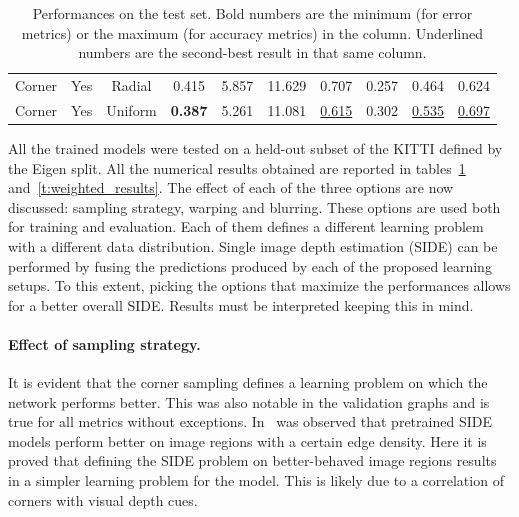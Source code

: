 \begin{table}
{\begin{tabular}{c|c|c|c|c|c|c|c|c|c}
        Corner & Yes & Radial  &            0.415  &            5.857  &            11.629  &            0.707  &            0.257  &            0.464  &            0.624  \\
        Corner & Yes & Uniform &    \textbf{0.387} &            5.261  &            11.081  & \underline{0.615} &            0.302  & \underline{0.535} & \underline{0.697} \\
    \end{tabular}
    }
    \caption{
        Performances on the test set.
        Bold numbers are the minimum (for error metrics) or the maximum (for accuracy metrics) in the column.
        Underlined numbers are the second-best result in that same column.
        \label{t:results}
    }
\end{table}

All the trained models were tested on a held-out subset of the KITTI defined by the Eigen split.
All the numerical results obtained are reported in tables~\ref{t:results} and~\ref{t:weighted_results}.
The effect of each of the three options are now discussed: sampling strategy, warping and blurring.
These options are used both for training and evaluation.
Each of them defines a different learning problem with a different data distribution.
Single image depth estimation (SIDE) can be performed by fusing the predictions produced by each of the proposed learning setups.
To this extent, picking the options that maximize the performances allows for a better overall SIDE.
Results must be interpreted keeping this in mind.

\paragraph{Effect of sampling strategy.}
It is evident that the corner sampling defines a learning problem on which the network performs better.
This was also notable in the validation graphs and is true for all metrics without exceptions.
In~\cite{BoostingDepth} was observed that pretrained SIDE models perform better on image regions with a certain edge density.
Here it is proved that defining the SIDE problem on better-behaved image regions results in a simpler learning problem for the model.
This is likely due to a correlation of corners with visual depth cues.


